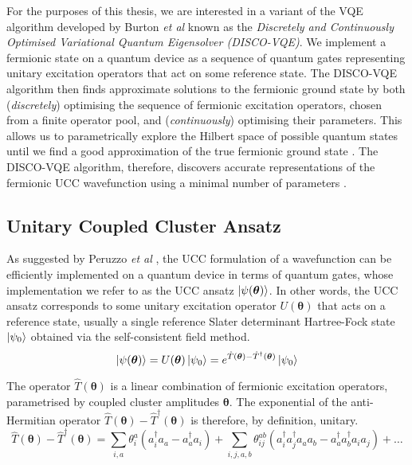 For the purposes of this thesis, we are interested in a variant of the VQE algorithm developed by Burton \textit{et al} \cite{Burton2023} known as the \textit{Discretely and Continuously Optimised Variational Quantum Eigensolver (DISCO-VQE)}. We implement a fermionic state on a quantum device as a sequence of quantum gates representing unitary excitation operators that act on some reference state. The DISCO-VQE algorithm then finds approximate solutions to the fermionic ground state by both (\textit{discretely}) optimising the sequence of fermionic excitation operators, chosen from a finite operator pool, and (\textit{continuously}) optimising their parameters. This allows us to parametrically explore the Hilbert space of possible quantum states until we find a good approximation of the true fermionic ground state \cite{Taube2006}. The DISCO-VQE algorithm, therefore, discovers accurate representations of the fermionic UCC wavefunction using a minimal number of parameters \cite{Burton2023}.


\subsection{Unitary Coupled Cluster Ansatz}%
\label{unitary-coupled-cluster-ansatz}

As suggested by Peruzzo \textit{et al} \cite{Peruzzo2014}, the UCC formulation of a wavefunction can be efficiently implemented on a quantum device in terms of quantum gates, whose implementation we refer to as the UCC ansatz $\ket{\psi(\bm\theta)}$. In other words, the UCC ansatz corresponds to some unitary excitation operator $U(\bm\theta)$ that acts on a reference state, usually a single reference Slater determinant Hartree-Fock state $\ket{\psi_0}$ obtained via the self-consistent field method.
\begin{equation*}
    \ket{\psi(\bm\theta)} = U(\bm\theta) \ket{\psi_0} =
    e^{\hat T(\bm\theta) - \hat T^\dagger(\bm\theta)} \ket{\psi_0}
\end{equation*}

The operator $\hat T(\bm\theta)$ is a linear combination of fermionic excitation operators, parametrised by coupled cluster amplitudes $\bm\theta$. The exponential of the anti-Hermitian operator $\hat T(\bm\theta) - \hat T^\dagger(\bm\theta)$ is therefore, by definition, unitary. 
\begin{equation*}
\hat T(\bm{\theta}) - \hat T^{\dagger}(\bm{\theta}) =
\sum_{i, a} \theta^a_i (a^\dagger_i a_a - a^\dagger_a a_i) + 
\sum_{i, j, a, b} \theta^{ab}_{ij} (a^\dagger_i a^\dagger_j a_a a_b - a^\dagger_a a^\dagger_b a_i a_j) + \dots
\end{equation*}

